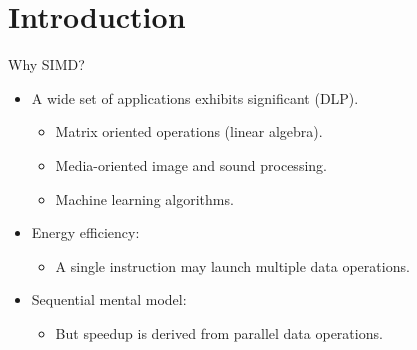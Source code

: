 \section{Introduction}

\begin{frame}[t]{Why SIMD?}
\begin{itemize}
  \item A wide set of applications exhibits significant  (DLP).
    \begin{itemize}
      \item Matrix oriented operations (linear algebra).
      \item Media-oriented image and sound processing.
      \item Machine learning algorithms.
    \end{itemize}

  \item Energy efficiency:
    \begin{itemize}
      \item A single instruction may launch multiple data operations.
    \end{itemize}

  \item Sequential mental model:
    \begin{itemize}
      \item But speedup is derived from parallel data operations.
    \end{itemize}
\end{itemize}
\end{frame}

